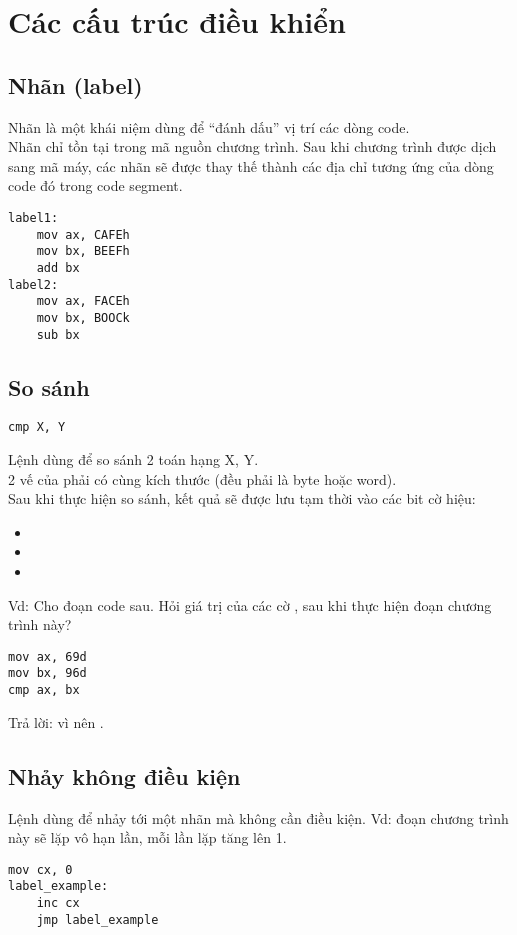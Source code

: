 \documentclass[main.tex]{subfiles}
\begin{document}
\section{Các cấu trúc điều khiển}
\subsection{Nhãn (label)}
Nhãn là một khái niệm dùng để ``đánh dấu'' vị trí các dòng code. \\
Nhãn chỉ tồn tại trong mã nguồn chương trình. Sau khi chương trình được dịch sang mã máy, các nhãn sẽ được thay thế thành các địa chỉ tương ứng của dòng code đó trong code segment.
\begin{verbatim}
label1:
    mov ax, CAFEh 
    mov bx, BEEFh 
    add bx 
label2:
    mov ax, FACEh 
    mov bx, BOOCk
    sub bx 
\end{verbatim}

\subsection{So sánh }
\begin{verbatim}
cmp X, Y
\end{verbatim}
Lệnh  dùng để so sánh 2 toán hạng \cd X, \cd Y.\\
2 vế của  phải có cùng kích thước (đều phải là byte hoặc word).\\
Sau khi thực hiện so sánh, kết quả sẽ được lưu tạm thời vào các bit cờ hiệu:
\begin{itemize}
    \item {}
    \item {}
    \item {}
\end{itemize}
Vd: Cho đoạn code sau. Hỏi giá trị của các cờ ,  sau khi thực hiện đoạn chương trình này?
\begin{verbatim}
mov ax, 69d
mov bx, 96d 
cmp ax, bx
\end{verbatim}
Trả lời: vì  nên .

\subsection{Nhảy không điều kiện }
Lệnh  dùng để nhảy tới một nhãn mà không cần điều kiện.
Vd: đoạn chương trình này sẽ lặp vô hạn lần, mỗi lần lặp tăng  lên 1.
\begin{verbatim}
mov cx, 0
label_example:
    inc cx 
    jmp label_example
\end{verbatim}
\end{document}
